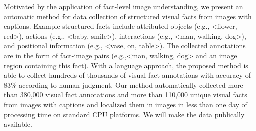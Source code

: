 Motivated by the application of fact-level image understanding, we present an automatic method for data collection of structured visual facts from images with captions. Example structured facts include attributed objects (e.g., <flower, red>), actions (e.g., <baby, smile>), interactions (e.g., <man, walking, dog>), and positional information (e.g., <vase, on, table>). The collected annotations are in the form of fact-image pairs (e.g.,<man, walking, dog> and an image region containing this fact). With a language approach, the proposed method is able to collect hundreds of thousands of visual fact annotations  with accuracy of 83\% according to human judgment. Our method automatically collected more than 380,000 visual fact annotations and more than 110,000 unique visual facts from images with captions and localized them in images in less than one day of processing time on standard CPU platforms. We will make the data publically available.
